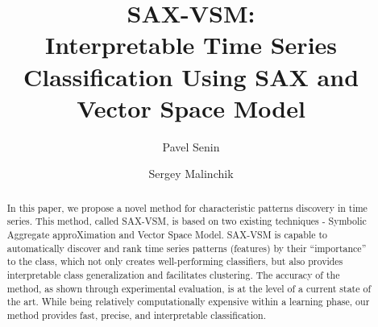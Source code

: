 \documentclass{llncs}
\begin{document}
%
\mainmatter              %
%
\title{SAX-VSM: \\Interpretable Time Series Classification Using SAX and Vector Space Model}
%
%
\author{Pavel Senin
\and Sergey Malinchik
}
%
%
%


\maketitle              %

\begin{abstract}
In this paper, we propose a novel method for characteristic patterns discovery in 
time series. This method, called SAX-VSM, is based on two existing techniques - 
Symbolic Aggregate approXimation and Vector Space Model. SAX-VSM is capable 
to automatically discover and rank time series patterns (features) by their 
“importance” to the class, which not only creates well-performing classifiers, 
but also provides interpretable class generalization and facilitates clustering. 
The accuracy of the method, as shown through experimental evaluation, is at the 
level of a current state of the art. 
While being relatively computationally expensive within a learning phase, 
our method provides fast, precise, and interpretable classification.
\end{abstract}
%
\end{document}
